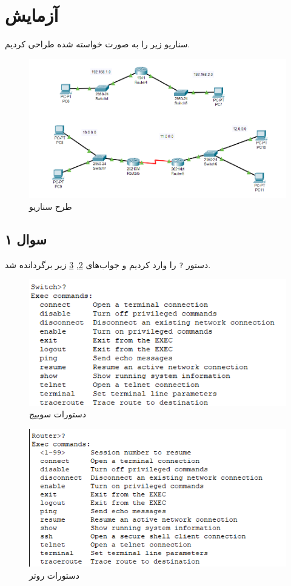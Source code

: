 \documentclass{perassignments}
\renewcommand{\maketitle}{\MakeMyLabTitle}
\begin{document}
	\maketitle
	\section{آزمایش}
	سناریو زیر را به صورت خواسته شده طراحی کردیم.
	\begin{figure}[H]
		\centering
		\includegraphics[width= 0.7\linewidth]{graphics/a.png}
		\caption{طرح سناریو}
		\label{fig:a}
	\end{figure}
	\subsection{سوال ۱}
	دستور 
	\texttt{?}
	را وارد کردیم و جواب‌های
	\ref{fig:b}, \ref{fig:c} 
	 زیر برگردانده شد. 
		\begin{figure}[H]
		\centering
		\includegraphics[width= 0.7\linewidth]{graphics/b.png}
		\caption{دستورات سوییج}
		\label{fig:b}
	\end{figure}
		\begin{figure}[H]
	\centering
	\includegraphics[width= 0.7\linewidth]{graphics/c.png}
	\caption{دستورات روتر}
	\label{fig:c}
\end{figure}
\end{document}
